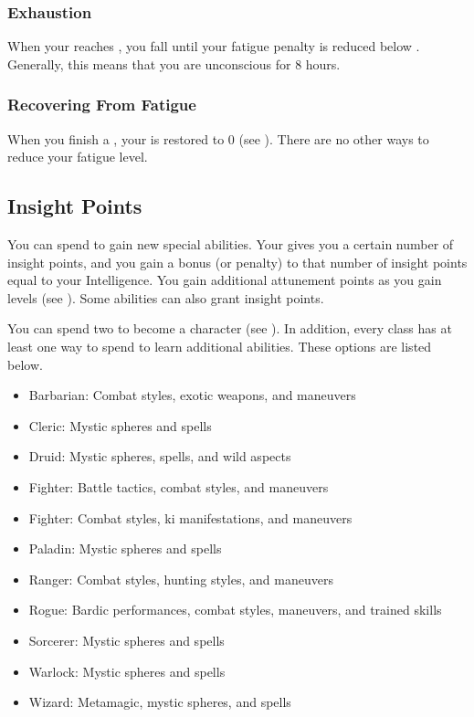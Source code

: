         \subsubsection{Exhaustion}\label{Exhaustion}
            When your  reaches , you fall \unconscious until your fatigue penalty is reduced below .
            Generally, this means that you are unconscious for 8 hours.

        \subsubsection{Recovering From Fatigue}
            When you finish a , your  is restored to 0 (see ).
            There are no other ways to reduce your fatigue level.

    \subsection{Insight Points}\label{Insight Points}
        You can spend  to gain new special abilities.
        Your  gives you a certain number of insight points, and you gain a bonus (or penalty) to that number of insight points equal to your Intelligence.
        You gain additional attunement points as you gain levels (see ).
        Some abilities can also grant insight points.
        
        You can spend two  to become a  character (see ).
        In addition, every class has at least one way to spend  to learn additional abilities.
        These options are listed below.
        \begin{itemize}
            \item Barbarian: Combat styles, exotic weapons, and maneuvers
            \item Cleric: Mystic spheres and spells
            \item Druid: Mystic spheres, spells, and wild aspects
            \item Fighter: Battle tactics, combat styles, and maneuvers
            \item Fighter: Combat styles, ki manifestations, and maneuvers
            \item Paladin: Mystic spheres and spells
            \item Ranger: Combat styles, hunting styles, and maneuvers
            \item Rogue: Bardic performances, combat styles, maneuvers, and trained skills
            \item Sorcerer: Mystic spheres and spells
            \item Warlock: Mystic spheres and spells
            \item Wizard: Metamagic, mystic spheres, and spells
        \end{itemize}


